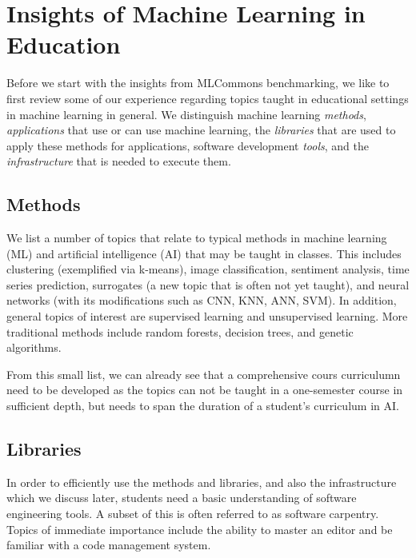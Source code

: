 \documentclass[utf8]{FrontiersinVancouver} %
\begin{document}
\section{Insights of Machine Learning in Education}
\label{sec:edu-ml}

Before we start with the insights from MLCommons benchmarking, we like
to first review some of our experience regarding topics taught in
educational settings in machine learning in general. We distinguish
machine learning {\em methods}, {\em applications} that use or can use
machine learning, the {\em libraries} that are used to apply these
methods for applications, software development {\em tools}, and the
{\em infrastructure} that is needed to execute them.

\subsection{Methods}

We list a number of topics that relate to typical methods in machine
learning (ML) and artificial intelligence (AI) that may be taught in
classes. This includes clustering (exemplified via k-means), image
classification, sentiment analysis, time series prediction, surrogates
(a new topic that is often not yet taught), and neural networks (with
its modifications such as CNN, KNN, ANN, SVM).  In addition, general
topics of interest are supervised learning and unsupervised learning.
More traditional methods include random forests, decision trees, and
genetic algorithms.

From this small list, we can already see that a comprehensive cours
curriculumn need to be developed as the topics can not be taught in a
one-semester course in sufficient depth, but needs to span the
duration of a student's curriculum in AI.

\subsection{Libraries}

In order to efficiently use the methods and libraries, and also the
infrastructure which we discuss later, students need a basic
understanding of software engineering tools. A subset of this is often
referred to as software carpentry. Topics of immediate importance
include the ability to master an editor and be familiar with a code
management system.
\end{document}
